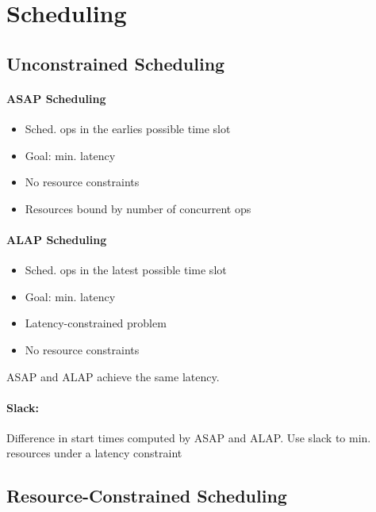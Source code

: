 \documentclass[a4paper]{article}
\begin{document}
\section{Scheduling}

\subsection{Unconstrained Scheduling}

\paragraph{ASAP Scheduling}

\begin{itemize}
    \item Sched. ops in the earlies possible time slot
    \item Goal: min. latency
    \item No resource constraints
    \item Resources bound by number of concurrent ops
\end{itemize}

\paragraph{ALAP Scheduling}

\begin{itemize}
    \item Sched. ops in the latest possible time slot
    \item Goal: min. latency
    \item Latency-constrained problem
    \item No resource constraints
\end{itemize}

\begin{subbox}{}
    ASAP and ALAP achieve the same latency.
\end{subbox}

\paragraph{Slack:} Difference in start times computed by ASAP and ALAP. Use slack to min. resources under a latency constraint

\subsection{Resource-Constrained Scheduling}
\end{document}
